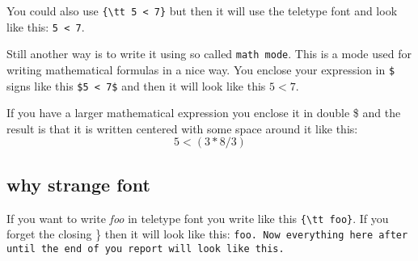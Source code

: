 \documentclass[a4paper,11pt]{article}
\begin{document}
You could also use {\tt \{\textbackslash tt 5 < 7\}} but then it
will use the teletype font and look like this: {\tt 5 < 7}.

Still another way is to write it using so called {\tt math mode}. This
is a mode used for writing mathematical formulas in a nice way. You
enclose your expression in {\tt \$} signs like this {\tt \$5 < 7\$}
and then it will look like this $5 < 7$.

If you have a larger mathematical expression you enclose it in double
\$ and the result is that it is written centered with some space
around it like this:  $$ 5 < (3 * 8 / 3 ) $$

\subsection*{why strange font}

If you want to write {\em foo} in teletype font you write like this
\verb+{\tt foo}+. If you forget the closing \} then it will look like
this: {\tt foo. Now everything here after until the end of you report
  will look like this. }
\end{document}
